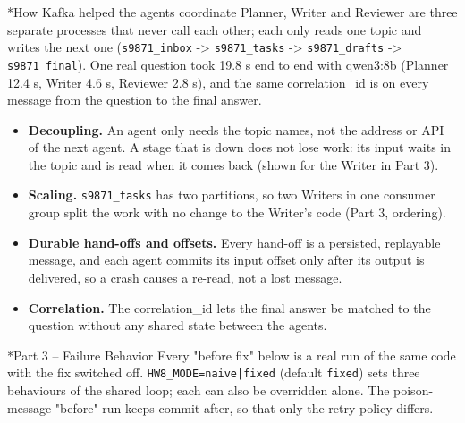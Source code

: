 \documentclass[11pt]{article}
\makeatletter
\renewcommand\section{\@startsection{section}{1}{\z@}{-3.0ex \@plus -1ex \@minus -.2ex}{1.2ex \@plus.2ex}{\normalfont\fontsize{14}{17}\selectfont\bfseries}}
\renewcommand\subsection{\@startsection{subsection}{2}{\z@}{-2.2ex \@plus -1ex \@minus -.2ex}{0.8ex \@plus.2ex}{\normalfont\fontsize{12}{14.5}\selectfont\bfseries}}
\makeatother
\begin{document}
\subsection*{How Kafka helped the agents coordinate}
Planner, Writer and Reviewer are three separate processes that never call each other; each only reads one topic and writes the next one (\texttt{s9871\_\allowbreak{}inbox} -> \texttt{s9871\_\allowbreak{}tasks} -> \texttt{s9871\_\allowbreak{}drafts} -> \texttt{s9871\_\allowbreak{}final}). One real question took 19.8 s end to end with qwen3:8b (Planner 12.4 s, Writer 4.6 s, Reviewer 2.8 s), and the same correlation\_id is on every message from the question to the final answer.

\begin{itemize}\setlength\itemsep{2pt}
\item \textbf{Decoupling.} An agent only needs the topic names, not the address or API of the next agent. A stage that is down does not lose work: its input waits in the topic and is read when it comes back (shown for the Writer in Part 3).
\item \textbf{Scaling.} \texttt{s9871\_\allowbreak{}tasks} has two partitions, so two Writers in one consumer group split the work with no change to the Writer's code (Part 3, ordering).
\item \textbf{Durable hand-offs and offsets.} Every hand-off is a persisted, replayable message, and each agent commits its input offset only after its output is delivered, so a crash causes a re-read, not a lost message.
\item \textbf{Correlation.} The correlation\_id lets the final answer be matched to the question without any shared state between the agents.
\end{itemize}
\section*{Part 3 -- Failure Behavior}
Every "before fix" below is a real run of the same code with the fix switched off. \texttt{HW8\_\allowbreak{}MODE=naive|fixed} (default \texttt{fixed}) sets three behaviours of the shared loop; each can also be overridden alone. The poison-message "before" run keeps commit-after, so that only the retry policy differs.
\end{document}
